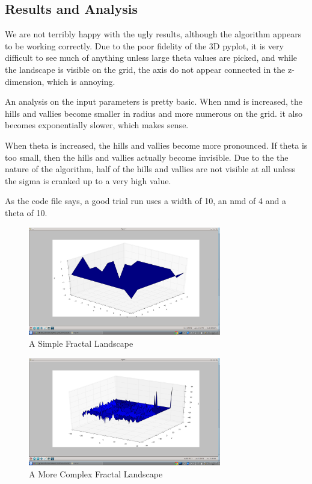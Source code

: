 \subsection{Results and Analysis}

We are not terribly happy with the ugly results, although the algorithm appears to be working correctly.   Due to the poor fidelity of the 3D pyplot, it is very difficult to see much of anything unless large theta values are picked, and while the landscape is visible on the grid, the axis do not appear connected in the z-dimension, which is annoying.

An analysis on the input parameters is pretty basic.  When nmd is increased, the hills and vallies become smaller in radius and more numerous on the grid.  it also becomes exponentially slower, which makes sense.

When theta is increased, the hills and vallies become more pronounced.   If theta is too small, then the hills and vallies actually become invisible.  Due to the the nature of the algorithm, half of the hills and vallies are not visible at all unless the sigma is cranked up to a very high value.

As the code file says, a good trial run uses a width of 10, an nmd of 4 and a theta of 10.  

\begin{figure}[tbh]
\begin{center}
\includegraphics[width=0.75\textwidth]{landscape1.png}
\end{center}
\caption{A Simple Fractal Landscape\label{fig:gprun}}
\end{figure}

\begin{figure}[tbh]
\begin{center}
\includegraphics[width=0.75\textwidth]{landscape2.png}
\end{center}
\caption{A More Complex Fractal Landscape\label{fig:gprun}}
\end{figure}
